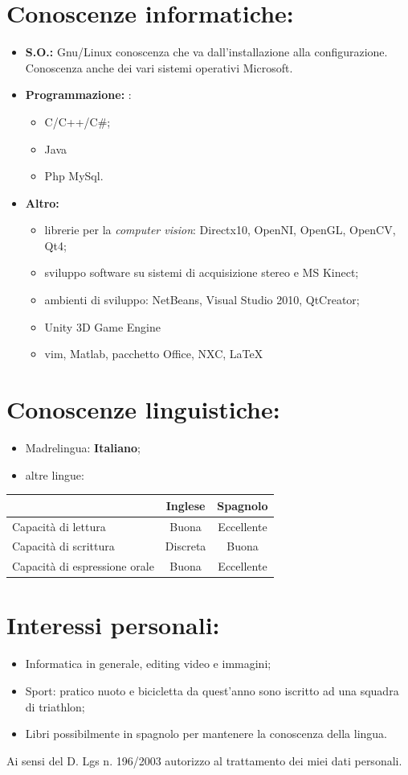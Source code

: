 \documentclass[pdftex,a4paper,10pt,twoside,titlepage,italian,openright]{article}
\begin{document}
\section*{Conoscenze informatiche:}
\begin{itemize}
	\item \textbf{S.O.:} Gnu/Linux conoscenza 	che va dall'installazione alla configurazione. Conoscenza anche dei vari 
	sistemi operativi Microsoft.
	\item \textbf{Programmazione: }:
	\begin{itemize}
	\item C/C++/C\#;
	\item Java
	\item Php MySql.
	\end{itemize}
	\item \textbf{Altro: }
	\begin{itemize}
	\item librerie per la {\itshape computer vision}: Directx10, OpenNI, OpenGL, OpenCV, Qt4;
	\item sviluppo software su sistemi di acquisizione stereo e MS Kinect;
	\item ambienti di sviluppo: NetBeans, Visual Studio 2010, QtCreator;
	\item Unity 3D Game Engine
	\item vim, Matlab, pacchetto Office, NXC, \LaTeX
	\end{itemize}
\end{itemize}
\section*{Conoscenze linguistiche:}
\begin{itemize}
	\item Madrelingua: \textbf{Italiano};
	\item altre lingue:
\end{itemize}
\begin{center}
	\begin{tabular}{|l|c|c|}
	\hline
	&\textbf{Inglese} & \textbf{Spagnolo}\\
	\hline
	Capacità di lettura & Buona & Eccellente\\
	\hline
	Capacità di scrittura & Discreta & Buona \\
	\hline
	Capacità di espressione orale & Buona & Eccellente \\
	\hline
	\end{tabular}
\end{center}
\section*{Interessi personali: }
\begin{itemize}
	\item Informatica in generale, editing video e immagini;
	\item Sport: pratico nuoto e bicicletta da quest'anno sono iscritto ad una squadra di triathlon;
	\item Libri possibilmente in spagnolo per mantenere la conoscenza della lingua.
\end{itemize}
\vfill
Ai sensi del D. Lgs n. 196/2003 autorizzo al trattamento dei miei dati personali.
\vspace{1cm}
\end{document}
